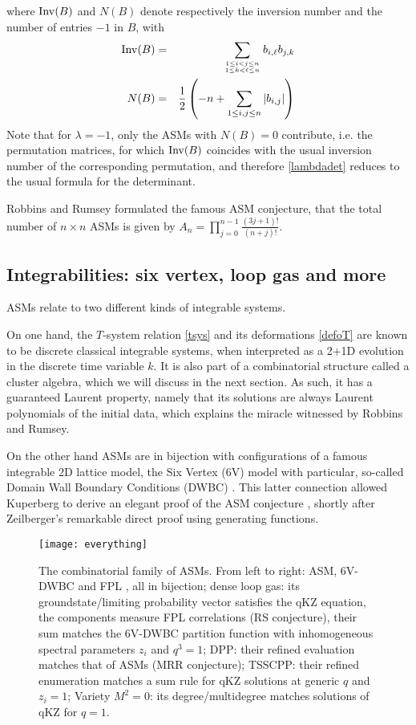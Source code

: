 \documentclass[12pt]{amsart}
\numberwithin{equation}{section}
\begin{document}
where ${\rm Inv}(B)$ and $N(B)$ denote respectively the inversion number and the number of entries $-1$ in $B$,
with 
\begin{eqnarray*}
{\rm Inv}(B)&=&\sum_{1\leq i<j \leq n\atop 1\leq k<\ell \leq n} b_{i,\ell}b_{j,k} \\
N(B)&=&\frac{1}{2}\left( -n+\sum_{1\leq i,j\leq n} |b_{i,j}| \right) 
\end{eqnarray*}
Note that for $\lambda=-1$, only the ASMs with $N(B)=0$ contribute, i.e. the permutation matrices, for which
${\rm Inv}(B)$ coincides with the usual inversion number of the corresponding permutation, and therefore \eqref{lambdadet}
reduces to the usual formula for the determinant.

Robbins and Rumsey formulated the famous ASM conjecture, that the total number of $n\times n$ ASMs is
given by $A_n=\prod_{j=0}^{n-1} \frac{(3j+1)!}{(n+j)!}$.

\subsection{Integrabilities: six vertex, loop gas and more}

ASMs relate to two different kinds of integrable systems. 

On one hand, the $T$-system relation \eqref{tsys}
and its deformations \eqref{defoT}
are known to be discrete classical integrable systems\cite{KLWZ}, 
when interpreted as a 2+1D evolution in the discrete time variable $k$.
It is also part of a combinatorial structure called a cluster algebra\cite{FZI}, 
which we will discuss in the next section. As such, it has
a guaranteed Laurent property, namely that its solutions are always Laurent polynomials of the initial data, which explains
the miracle witnessed by Robbins and Rumsey.

On the other hand ASMs are in bijection with configurations of a famous
integrable 2D lattice model, the Six Vertex (6V) model with particular, so-called Domain Wall Boundary Conditions (DWBC)
\cite{KO,IZ}. 
This latter connection allowed Kuperberg to derive an elegant
proof of the ASM conjecture \cite{KUP}, shortly after Zeilberger's remarkable 
direct proof using generating functions\cite{ZEIL}.

\begin{figure}
\centering
\texttt{[image: everything]}
\caption{\small The combinatorial family of ASMs. From left to right: ASM, 6V-DWBC and FPL , all in bijection;
dense loop gas: its groundstate/limiting probability vector satisfies the qKZ equation, the components measure 
FPL correlations (RS conjecture), their sum matches the 6V-DWBC partition function with inhomogeneous 
spectral parameters $z_i$ and $q^3=1$; DPP: their refined evaluation matches that of ASMs (MRR conjecture);
TSSCPP: their refined enumeration matches a sum rule for qKZ solutions at generic $q$ and $z_i=1$; Variety $M^2=0$: 
its degree/multidegree matches solutions of qKZ for $q=1$.}
\label{fig:everything}
\end{figure}
\end{document}

